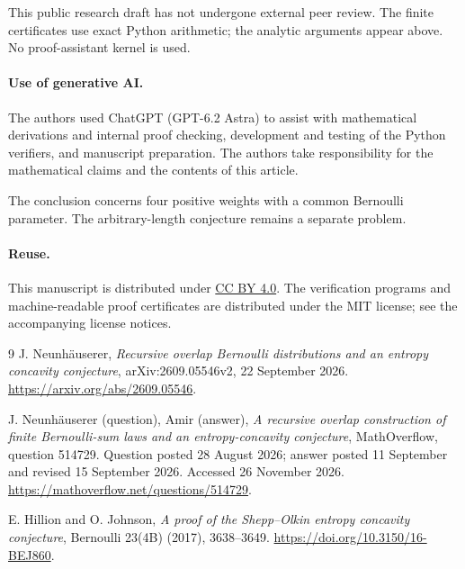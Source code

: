 \documentclass[11pt,a4paper]{article}
\begin{document}
This public research draft has not undergone external peer review. The
finite certificates use exact Python arithmetic; the analytic arguments
appear above. No proof-assistant kernel is used.

\paragraph{Use of generative AI.}
The authors used ChatGPT (GPT-6.2 Astra) to assist with mathematical
derivations and internal proof checking, development and testing of the
Python verifiers, and manuscript preparation. The authors take responsibility
for the mathematical claims and the contents of this article.

The conclusion concerns four positive weights with a common Bernoulli
parameter. The arbitrary-length conjecture remains a separate problem.

\paragraph{Reuse.}
This manuscript is distributed under
\href{https://creativecommons.org/licenses/by/4.0/}{CC BY 4.0}.
The verification programs and machine-readable proof certificates are
distributed under the MIT license; see the accompanying license notices.

\begin{thebibliography}{9}
J. Neunhäuserer,
\emph{Recursive overlap Bernoulli distributions and an entropy concavity
conjecture}, arXiv:2609.05546v2, 22 September 2026.
\url{https://arxiv.org/abs/2609.05546}.

J. Neunhäuserer (question), Amir (answer),
\emph{A recursive overlap construction of finite Bernoulli-sum laws
and an entropy-concavity conjecture}, MathOverflow, question 514729.
Question posted 28 August 2026; answer posted 11 September and
revised 15 September 2026. Accessed 26 November 2026.
\url{https://mathoverflow.net/questions/514729}.

E. Hillion and O. Johnson,
\emph{A proof of the Shepp--Olkin entropy concavity conjecture},
Bernoulli 23(4B) (2017), 3638--3649.
\url{https://doi.org/10.3150/16-BEJ860}.
\end{thebibliography}
\end{document}
